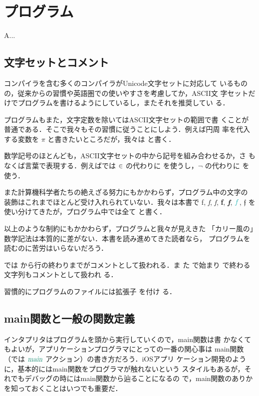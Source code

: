 \documentclass[a5paper,twoside,fleqn,draft]{jsbook}
\begin{document}
\chapter{プログラム}
\label{ch:program}

\begin{leader}
A...
\end{leader}

\section{文字セットとコメント}

\haskell コンパイラを含む多くのコンパイラがUnicode文字セットに対応して
いるものの，従来からの習慣や英語圏での使いやすさを考慮してか，ASCII文
字セットだけでプログラムを書けるようにしているし，またそれを推奨してい
る．

\haskell プログラムもまた，文字定数を除いてはASCII文字セットの範囲で書
くことが普通である．そこで我々もその習慣に従うことにしよう．例えば円周
率を代入する変数を $\pi$ と書きたいところだが，我々は  と書く．

数学記号のほとんども，ASCII文字セットの中から記号を組み合わせるか，さ
もなくば言葉で表現する．例えば\haskell では $\operatorname{\in}$ の代わりに
\code{<-} を使うし，$\neg$ の代わりに  を使う．

また計算機科学者たちの絶えざる努力にもかかわらず，プログラム中の文字の
装飾はこれまでほとんど受け入れられていない．我々は本書で \textrm{f},
\textit{f}, \textsl{f}, \textbf{f}, \textbf{\textit{f}}, $\hFunc{f}$,
$\mathfrak{f}$ を使い分けてきたが，\haskell プログラム中では全て
 と書く．

以上のような制約にもかかわらず，\haskell プログラムと我々が見えきた
「カリー風の」数学記法は本質的に差がない．本書を読み進めてきた読者なら，
\haskell プログラムを読むのに苦労はいらないだろう．

\haskell では \code{--} から行の終わりまでがコメントとして扱われる．ま
た \code{\{-} で始まり \code{-\}} で終わる文字列もコメントとして扱われ
る．

\separator

習慣的に\haskell プログラムのファイルには拡張子  を付け
る．

\section{main関数と一般の関数定義}

\python インタプリタはプログラムを頭から実行していくので，main関数は書
かなくてもよいが，アプリケーションプログラマにとっての一番の関心事は
main関数（\haskell では $\mMain$ アクション）の書き方だろう．iOSアプリ
ケーション開発のように，基本的にはmain関数をプログラマが触れないという
スタイルもあるが，それでもデバッグの時にはmain関数から辿ることになるの
で，main関数のありかを知っておくことはいつでも重要だ．
\end{document}

